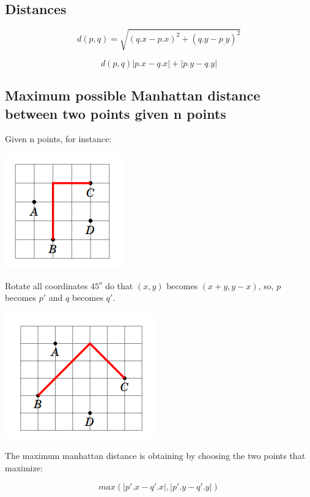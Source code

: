 \subsection{Distances}

$$ d(p,q) = {\sqrt {(q.x-p.x)^{2}+(q.y-p_.y)^{2}}} $$

$$ d(p,q) |p.x - q.x| + |p.y - q.y| $$

\subsection{Maximum possible Manhattan distance between two points given n points}

Given n points, for instance:
\begin{center}
  \includegraphics[scale=.6, keepaspectratio]{./theoretical/assets/manhattan_before.png}
\end{center}

Rotate all coordinates $45^{o}$ do that $(x, y)$ becomes $(x+y, y-x)$, so, $p$ becomes $p'$ and $q$ becomes $q'$.
\begin{center}
  \includegraphics[scale=.6, keepaspectratio]{./theoretical/assets/manhattan_after.png}
\end{center}

The maximum manhattan distance is obtaining by choosing the two points that maximize:

$$ max(|p'.x - q'.x|, |p'.y - q'.y|) $$